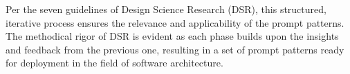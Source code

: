 


Per the seven guidelines of Design Science Research (DSR), this structured, iterative process ensures the relevance and applicability of the prompt patterns. The methodical rigor of DSR is evident as each phase builds upon the insights and feedback from the previous one, resulting in a set of prompt patterns ready for deployment in the field of software architecture.


